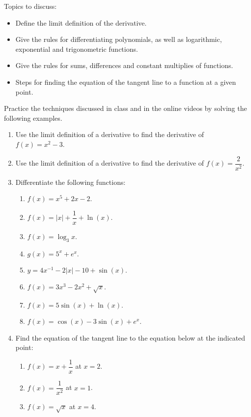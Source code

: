 \documentclass[10pt]{book}
\theoremstyle{definition}
\theoremstyle{remark}
\begin{document}
\begin{large}
\noindent
Topics to discuss:
\begin{itemize}
\item Define the limit definition of the derivative. 
\item Give the rules for differentiating polynomials, as well as logarithmic, exponential and trigonometric functions. 
\item Give the rules for sums, differences and constant multiplies of functions. 
\item Steps for finding the equation of the tangent line to a function at a given point. 
\end{itemize}
\newpage

\noindent
Practice the techniques discussed in class and in the online videos by solving the following examples. 
\begin{enumerate}
\item Use the limit definition of a derivative to find the derivative of $f (x) = x^2 - 3$.\vfil\vfil
\item Use the limit definition of a derivative to find the derivative of $f (x) =\dfrac{2}{x^2}$.\vfil
\newpage

\item Differentiate the following functions:
\begin{enumerate}
\item  $f (x) = x^5 +2x-2$. \bigskip \bigskip\bigskip \bigskip
\item  $f (x) = |x| +\dfrac{1}{x} + \ln(x)$. \vfill
\item  $f \left(x\right) = \log_3 x$. \vfill
\item  $g\left(x\right) = 5^x + e^x$. \vfill
\item  $y = 4x^{-1} - 2|x| - 10 + \sin(x)$. \vfill
\item  $f (x) = 3x^3 - 2x^2 + \sqrt{x}$. \vfill
\item  $f (x) = 5\sin(x) + \ln(x)$. \vfill
\item  $f (x) = \cos(x) - 3\sin(x) + e^x$. \vfill
\end{enumerate}
\newpage

\item Find the equation of the tangent line to the equation below at the indicated point:
\begin{enumerate}
    \item  $f (x) = x + \dfrac{1}{x}$ at $x = 2$.\vfill 
    \item  $f (x) = \dfrac{1}{x^2}$ at $x = 1$.\vfill \vfil
    \item  $f (x) = \sqrt{x}$ at $x = 4$.\vfill
\end{enumerate}
\newpage


\end{enumerate}
\end{large}
\end{document}
